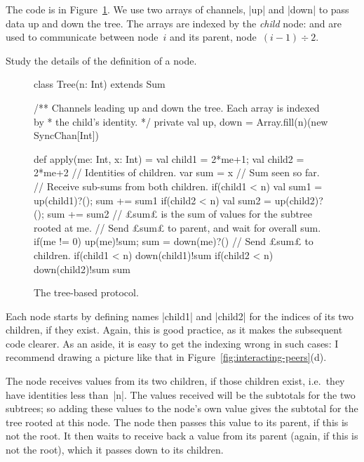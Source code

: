 The code is in Figure~\ref{fig:sum-tree}.  We use two arrays of channels, |up|
and |down| to pass data up and down the tree.  The arrays are indexed by the
\emph{child} node:  and  are used to communicate
between node~$i$ and its parent, node~$(i-1) \div 2$.

\begin{instruction}
Study the details of the definition of a node. 
\end{instruction}


\begin{figure}[bht]
\begin{scala}
class Tree(n: Int) extends Sum{
  /** Channels leading up and down the tree.  Each array is indexed by
    * the child's identity. */
  private val up, down = Array.fill(n)(new SyncChan[Int])
  
  def apply(me: Int, x: Int) = {
    val child1 = 2*me+1; val child2 = 2*me+2  // Identities of children.
    var sum = x                                     // Sum seen so far.
    // Receive sub-sums from both children.
    if(child1 < n){ val sum1 = up(child1)?(); sum += sum1 }
    if(child2 < n){ val sum2 = up(child2)?(); sum += sum2 }
    // £sum£ is the sum of values for the subtree rooted at me.
    // Send £sum£ to parent, and wait for overall sum.
    if(me != 0){ up(me)!sum; sum = down(me)?() }
    // Send £sum£ to children.
    if(child1 < n) down(child1)!sum
    if(child2 < n) down(child2)!sum
    sum
  }
}
\end{scala}
\caption{The tree-based protocol.}
\label{fig:sum-tree}
\end{figure}


Each node starts by defining names |child1| and |child2| for the indices of
its two children, if they exist.  Again, this is good practice, as it makes
the subsequent code clearer.  As an aside, it is easy to get the indexing
wrong in such cases: I recommend drawing a picture like that in
Figure~\ref{fig:interacting-peers}(d).  

The node receives values from its two
children, if those children exist, i.e.~they have identities less than~|n|.
The values received will be the subtotals for the two subtrees; so adding
these values to the node's own value gives the subtotal for the tree rooted at
this node.  The node then passes this value to its parent, if this is not the
root.  It then waits to receive back a value from its parent (again, if this
is not the root), which it passes down to its children.

